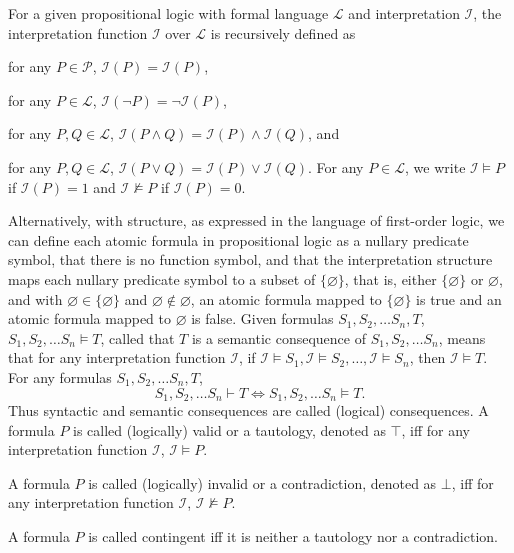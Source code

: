 \documentclass[a4paper,12pt]{article}
\begin{document}
For a given propositional logic with formal language $\mathcal{L}$ and interpretation $\mathcal{I}$, the interpretation function $\mathscr{I}$ over $\mathcal{L}$ is recursively defined as
\bit
\item for any $P\in\mathcal{P}$, $\mathscr{I}(P)=\mathcal{I}(P)$,
\item for any $P\in\mathcal{L}$, $\mathscr{I}(\neg P)=\neg\mathscr{I}(P)$,
\item for any $P,Q\in\mathcal{L}$, $\mathscr{I}(P\land Q)=\mathscr{I}(P)\land\mathscr{I}(Q)$, and
\item for any $P,Q\in\mathcal{L}$, $\mathscr{I}(P\lor Q)=\mathscr{I}(P)\lor\mathscr{I}(Q)$.
\eit
For any $P\in\mathcal{L}$, we write $\mathcal{I}\vDash P$ if $\mathscr{I}(P)=1$ and $\mathcal{I}\nvDash P$ if $\mathscr{I}(P)=0$.

Alternatively, with structure, as expressed in the language of first-order logic, we can define each atomic formula in propositional logic as a nullary predicate symbol, that there is no function symbol, and that the interpretation structure maps each nullary predicate symbol to a subset of $\{\varnothing\}$, that is, either $\{\varnothing\}$ or $\varnothing$, and with $\varnothing\in\{\varnothing\}$ and $\varnothing\notin\varnothing$, an atomic formula mapped to $\{\varnothing\}$ is true and an atomic formula mapped to $\varnothing$ is false.
Given formulas $S_1,S_2,\ldots S_n,T$, $S_1,S_2,\ldots S_n\vDash T$, called that $T$ is a semantic consequence of $S_1,S_2,\ldots S_n$, means that for any interpretation function $\mathcal{I}$, if $\mathcal{I}\vDash S_1,\mathcal{I}\vDash S_2,\ldots,\mathcal{I}\vDash S_n$, then $\mathcal{I}\vDash T$.
For any formulas $S_1,S_2,\ldots S_n,T$,
\[S_1,S_2,\ldots S_n\vdash T\iff S_1,S_2,\ldots S_n\vDash T.\]
Thus syntactic and semantic consequences are called (logical) consequences.
A formula $P$ is called (logically) valid or a tautology, denoted as $\top$, iff for any interpretation function $\mathcal{I}$, $\mathcal{I}\vDash P$.

A formula $P$ is called (logically) invalid or a contradiction, denoted as $\bot$, iff for any interpretation function $\mathcal{I}$, $\mathcal{I}\nvDash P$.

A formula $P$ is called contingent iff it is neither a tautology nor a contradiction.
\end{document}
